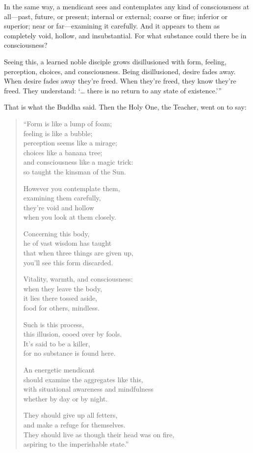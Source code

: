 \documentclass[12pt,openany]{book}%
\begin{document}
In the same way, a mendicant sees and contemplates any kind of consciousness at all—past, future, or present; internal or external; coarse or fine; inferior or superior; near or far—examining it carefully. And it appears to them as completely void, hollow, and insubstantial. For what substance could there be in consciousness? 

Seeing this, a learned noble disciple grows disillusioned with form, feeling, perception, choices, and consciousness. Being disillusioned, desire fades away. When desire fades away they’re freed. When they’re freed, they know they’re freed. They understand: ‘… there is no return to any state of existence.’” 

That is what the Buddha said. Then the Holy One, the Teacher, went on to say: 

\begin{verse}%
“Form is like a lump of foam; \\
feeling is like a bubble; \\
perception seems like a mirage; \\
choices like a banana tree; \\
and consciousness like a magic trick: \\
so taught the kinsman of the Sun. 

However you contemplate them, \\
examining them carefully, \\
they’re void and hollow \\
when you look at them closely. 

Concerning this body, \\
he of vast wisdom has taught \\
that when three things are given up, \\
you’ll see this form discarded. 

Vitality, warmth, and consciousness: \\
when they leave the body, \\
it lies there tossed aside, \\
food for others, mindless. 

Such is this process, \\
this illusion, cooed over by fools. \\
It’s said to be a killer, \\
for no substance is found here. 

An energetic mendicant \\
should examine the aggregates like this, \\
with situational awareness and mindfulness \\
whether by day or by night. 

They should give up all fetters, \\
and make a refuge for themselves. \\
They should live as though their head was on fire, \\
aspiring to the imperishable state.” 

%
\end{verse}
\end{document}
